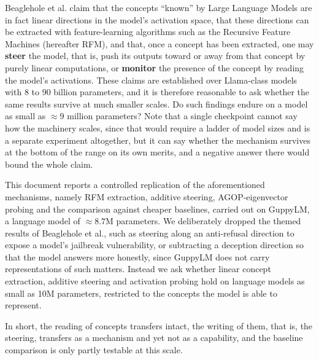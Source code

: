 Beaglehole et al. \cite{beaglehole2026toward} claim that the concepts ``known'' by Large Language Models are in fact linear directions in the model's activation space, that these directions can be extracted with feature-learning algorithms such as the Recursive Feature Machines (hereafter RFM), and that, once a concept has been extracted, one may \textbf{steer} the model, that is, push its outputs toward or away from that concept by purely linear computations, or \textbf{monitor} the presence of the concept by reading the model's activations. These claims are established over Llama-class models with 8 to 90 billion parameters, and it is therefore reasonable to ask whether the same results survive at much smaller scales. Do such findings endure on a model as small as $\approx 9$ million parameters? Note that a single checkpoint cannot say how the machinery scales, since that would require a ladder of model sizes and is a separate experiment altogether, but it can say whether the mechanism survives at the bottom of the range on its own merits, and a negative answer there would bound the whole claim.

This document reports a controlled replication of the aforementioned mechanisms, namely RFM extraction, additive steering, AGOP-eigenvector probing and the comparison against cheaper baselines, carried out on GuppyLM, a language model of $\approx 8.7$M parameters. We deliberately dropped the themed results of Beaglehole et al., such as steering along an anti-refusal direction to expose a model's jailbreak vulnerability, or subtracting a deception direction so that the model answers more honestly, since GuppyLM does not carry representations of such matters. Instead we ask whether linear concept extraction, additive steering and activation probing hold on language models as small as 10M parameters, restricted to the concepts the model is able to represent.

In short, the reading of concepts transfers intact, the writing of them, that is, the steering, transfers as a mechanism and yet not as a capability, and the baseline comparison is only partly testable at this scale.
